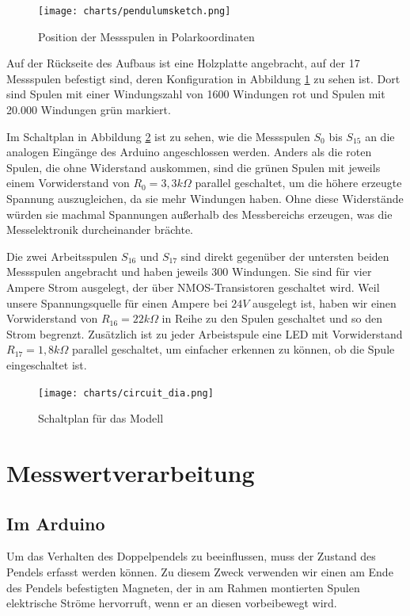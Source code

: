 \begin{figure}[bht]
  \texttt{[image: charts/pendulumsketch.png]}
  \caption{Position der Messspulen in Polarkoordinaten}
  \label{fig:pendulumsketch}
\end{figure}

Auf der Rückseite des Aufbaus ist eine Holzplatte angebracht, auf der 17 Messspulen befestigt sind, deren Konfiguration in Abbildung \ref{fig:pendulumsketch} zu sehen ist.
Dort sind Spulen mit einer Windungszahl von 1600 Windungen rot und Spulen mit 20.000 Windungen grün markiert.

Im Schaltplan in Abbildung \ref{fig:circuit} ist zu sehen, wie die Messspulen $S_0$ bis $S_{15}$ an die analogen Eingänge des Arduino angeschlossen werden.
Anders als die roten Spulen, die ohne Widerstand auskommen, sind die grünen Spulen mit jeweils einem Vorwiderstand von $R_0 = 3,3 k\Omega$ parallel geschaltet, um die höhere erzeugte Spannung auszugleichen, da sie mehr Windungen haben. Ohne diese Widerstände würden sie machmal Spannungen
außerhalb des Messbereichs erzeugen, was die Messelektronik durcheinander brächte.

Die zwei Arbeitsspulen $S_{16}$ und $S_{17}$ sind direkt gegenüber der untersten beiden Messspulen angebracht und haben jeweils 300 Windungen.
Sie sind für vier Ampere Strom ausgelegt, der über NMOS-Transistoren geschaltet wird.
Weil unsere Spannungsquelle für einen Ampere bei $24 V$ ausgelegt ist, haben wir einen Vorwiderstand von $R_{16} = 22 k\Omega$ in Reihe zu den Spulen geschaltet und so den Strom begrenzt.
Zusätzlich ist zu jeder Arbeistspule eine LED mit Vorwiderstand $R_{17} = 1,8 k\Omega$ parallel geschaltet, um einfacher erkennen zu können, ob die Spule eingeschaltet ist.

\begin{figure}[bht]
  \texttt{[image: charts/circuit\_dia.png]}
  \caption{Schaltplan für das Modell}
  \label{fig:circuit}
\end{figure}

\section{Messwertverarbeitung}

\subsection{Im Arduino}

Um das Verhalten des Doppelpendels zu beeinflussen, muss der Zustand des Pendels
erfasst werden können. Zu diesem Zweck verwenden wir einen am Ende des Pendels
befestigten Magneten, der in am Rahmen montierten Spulen elektrische Ströme
hervorruft, wenn er an diesen vorbeibewegt wird.

